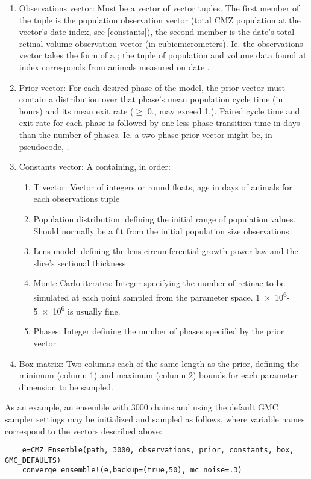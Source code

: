 \begin{enumerate}
    \item Observations vector: Must be a vector of vector tuples. The first member of the tuple is the population observation vector (total CMZ population at the vector's date index, see \ref{constants}), the second member is the date's total retinal volume observation vector (in \si{cubic}{micro}{meters}). Ie. the observations vector takes the form of a ; the tuple of population and volume data found at index  corresponds from animals measured on date .
    \item Prior vector: For each desired phase of the model, the prior vector must contain a distribution over that phase's mean population cycle time (in hours) and its mean exit rate ($\geq$ 0., may exceed 1.). Paired cycle time and exit rate for each phase is followed by one less phase transition time in days than the number of phases. Ie. a two-phase prior vector might be, in pseudocode, . 
    \item\label{constants} Constants vector: A  containing, in order:
    \begin{enumerate}
        \item T vector: Vector of integers or round floats, age in days of animals for each observations tuple
        \item Population distribution:  defining the initial range of population values. Should normally be a fit from the initial population size observations
        \item Lens model:   defining the lens circumferential growth power law and the slice's sectional thickness.
        \item Monte Carlo iterates: Integer specifying the number of retinae to be simulated at each point sampled from the parameter space. \num{1e6}-\num{5e6} is usually fine.
        \item Phases: Integer defining the number of phases specified by the prior vector
    \end{enumerate}
    \item Box matrix: Two columns each of the same length as the prior, defining the minimum (column 1) and maximum (column 2) bounds for each parameter dimension to be sampled.
\end{enumerate}

As an example, an ensemble with 3000 chains and using the default GMC sampler settings may be initialized and sampled as follows, where variable names correspond to the vectors described above:

\begin{verbatim}
    e=CMZ_Ensemble(path, 3000, observations, prior, constants, box, GMC_DEFAULTS)
    converge_ensemble!(e,backup=(true,50), mc_noise=.3)
\end{verbatim}